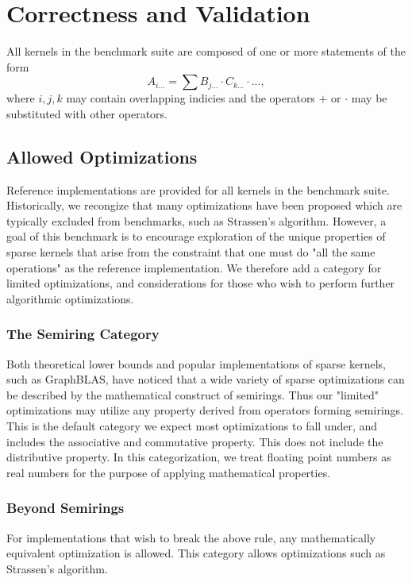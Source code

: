 \documentclass{article}
\begin{document}
\section{Correctness and Validation}

    All kernels in the benchmark suite are composed of one or more statements of the form
    \begin{equation}\label{eq:einsum}
        A_{i...} = \sum B_{j...} \cdot C_{k...} \cdot ... ,
    \end{equation}
    where $i, j, k$ may contain overlapping indicies and the operators $+$ or $\cdot$ may be substituted with other operators.

    \subsection{Allowed Optimizations}
        Reference implementations are provided for all kernels in the benchmark suite. Historically, we recongize that many optimizations have been proposed which are typically excluded from benchmarks, such as Strassen's algorithm. However, a goal of this benchmark is to encourage exploration of the unique properties of sparse kernels that arise from the constraint that one must do "all the same operations" as the reference implementation. We therefore add a category for limited optimizations, and considerations for those who wish to perform further algorithmic optimizations.

    \subsubsection{The Semiring Category}
        Both theoretical lower bounds and popular implementations of sparse kernels, such as GraphBLAS, have noticed that a wide variety of sparse optimizations can be described by the mathematical construct of semirings. Thus our "limited" optimizations may utilize any property derived from operators forming semirings. This is the default category we expect most optimizations to fall under, and includes the associative and commutative property. This does not include the distributive property.  In this categorization, we treat floating point numbers as real numbers for the purpose of applying mathematical properties.
    \subsubsection{Beyond Semirings}
        For implementations that wish to break the above rule, any mathematically equivalent optimization is allowed. This category allows optimizations such as Strassen's algorithm. 
\end{document}
